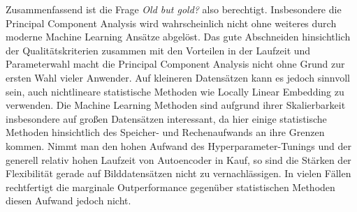 Zusammenfassend ist die Frage \textit{Old but gold?} also berechtigt. Insbesondere die Principal
Component Analysis wird wahrscheinlich nicht ohne weiteres durch moderne Machine Learning Ansätze
abgelöst. Das gute Abschneiden hinsichtlich der Qualitätskriterien zusammen mit den Vorteilen in
der Laufzeit und Parameterwahl macht die Principal Component Analysis nicht ohne Grund zur ersten
Wahl vieler Anwender. Auf kleineren Datensätzen kann es jedoch sinnvoll sein, auch nichtlineare
statistische Methoden wie Locally Linear Embedding zu verwenden. Die Machine Learning Methoden sind
aufgrund ihrer Skalierbarkeit insbesondere auf großen Datensätzen interessant, da hier einige
statistische Methoden hinsichtlich des Speicher- und Rechenaufwands an ihre Grenzen kommen. Nimmt
man den hohen Aufwand des Hyperparameter-Tunings und der generell relativ hohen Laufzeit von
Autoencoder in Kauf, so sind die Stärken der Flexibilität gerade auf Bilddatensätzen nicht zu
vernachlässigen. In vielen Fällen rechtfertigt die marginale Outperformance gegenüber statistischen
Methoden diesen Aufwand jedoch nicht.
